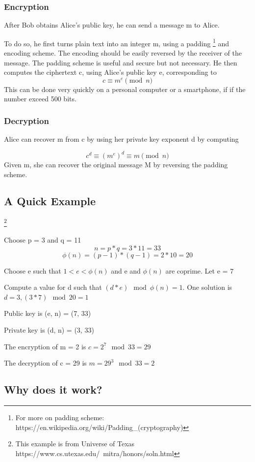 \documentclass[]{article}
\begin{document}
\subsubsection{Encryption}
After Bob obtains Alice's public key, he can send a message m to Alice.

To do so, he first turns plain text into an integer m, using a padding \footnote{For more on padding scheme: https://en.wikipedia.org/wiki/Padding\_(cryptography)} and encoding scheme.  The encoding should be easily reversed by the receiver of the message. The padding scheme is useful and secure but not necessary. He then computes the ciphertext c, using Alice's public key e, corresponding to
\[c \equiv m^e \pmod{n} \]
This can be done very quickly on a personal computer or a smartphone, if if the number exceed 500 bits.

\subsubsection{Decryption}
Alice can recover m from c by using her private key exponent d by computing

\[{c^{d}\equiv (m^{e})^{d}\equiv m{\pmod {n}}}\]
Given m, she can recover the original message M by reversing the padding scheme.

\subsection{A Quick Example}\footnote{This example is from Universe of Texas https://www.cs.utexas.edu/~mitra/honors/soln.html}

Choose p = 3 and q = 11 
\[n = p * q = 3 * 11 = 33\]
\[\phi(n) = (p - 1) * (q - 1) = 2 * 10 = 20\]

Choose e such that \(1 < e < \phi(n)\) and e and \(\phi (n)\) are coprime. Let e = 7

Compute a value for d such that \((d * e)\mod  \phi(n) = 1\). One solution is \(d = 3, (3 * 7) \mod 20 = 1\)

Public key is (e, n) = (7, 33)

Private key is (d, n) = (3, 33)

The encryption of m = 2 is \(c = 2^{7} \mod 33 = 29\)

The decryption of c = 29 is \(m = 29^{3} \mod 33 = 2\)

\subsection{Why does it work?}
\end{document}
